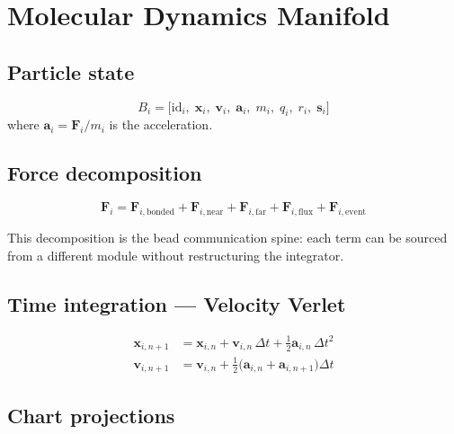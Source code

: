 \documentclass[11pt, a4paper, oneside]{article}
\newcommand{\xvec}{\mathbf{x}}
\newcommand{\vvec}{\mathbf{v}}
\newcommand{\Fvec}{\mathbf{F}}
\newcommand{\avec}{\mathbf{a}}
\begin{document}
\section{Molecular Dynamics Manifold}
\label{sec:md}

\subsection{Particle state}

\begin{equation}
  B_i = \bigl[\mathrm{id}_i,\; \xvec_i,\; \vvec_i,\; \avec_i,\;
               m_i,\; q_i,\; r_i,\; \mathbf{s}_i\bigr]
  \label{eq:particle}
\end{equation}
where $\avec_i = \Fvec_i / m_i$ is the acceleration.

\subsection{Force decomposition}

\begin{equation}
  \Fvec_i = \Fvec_{i,\mathrm{bonded}}
           + \Fvec_{i,\mathrm{near}}
           + \Fvec_{i,\mathrm{far}}
           + \Fvec_{i,\mathrm{flux}}
           + \Fvec_{i,\mathrm{event}}
  \label{eq:force_decomp}
\end{equation}

This decomposition is the bead communication spine: each term can be sourced
from a different module without restructuring the integrator.

\subsection{Time integration --- Velocity Verlet}

\begin{align}
  \xvec_{i,n+1} &= \xvec_{i,n} + \vvec_{i,n}\,\Delta t
    + \tfrac{1}{2}\avec_{i,n}\,\Delta t^2
  \label{eq:vv_x} \\[4pt]
  \vvec_{i,n+1} &= \vvec_{i,n}
    + \tfrac{1}{2}\bigl(\avec_{i,n} + \avec_{i,n+1}\bigr)\Delta t
  \label{eq:vv_v}
\end{align}

\subsection{Chart projections}
\end{document}
